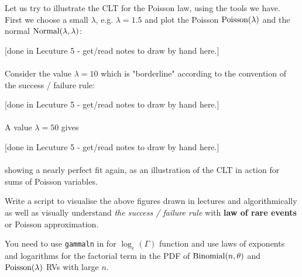 Let us try to illustrate the CLT for the Poisson law, using the tools we
have. First we choose a small $\lambda $, e.g. $\lambda =1.5$ and plot the
Poisson $\mbox{{\rm Poisson}}(\lambda )$ and the normal $\mbox{{\rm Normal}}(\lambda ,\lambda )$:


{\scriptsize [done in Lecuture 5 - get/read notes to draw by hand here.]}\\
\vspace{3cm} 
~\\


Consider the value $\lambda =10$ which is "borderline" according to the
convention of the success / failure rule: 


{\scriptsize [done in Lecuture 5 - get/read notes to draw by hand here.]}\\
\vspace{3cm} 
~\\


A value $\lambda =50$ gives 


{\scriptsize [done in Lecuture 5 - get/read notes to draw by hand here.]}\\
\vspace{3cm} 
~\\


showing a nearly perfect
fit again, as an illustration of the CLT in action for sums of Poisson
variables.

\begin{labwork}\label{LW:VisualiseSuccessFailureRulePoisson}
Write a \Matlab script to visualise the above figures drawn in lectures and algorithmically as well as visually understand {\em the success / failure rule} with {\bf law of rare events} or Poisson approximation.

You need to use {\tt gammaln} in \Matlab for $\log_e(\Gamma)$ function and use laws of exponents and logarithms for the factorial term in the PDF of $\mbox{{\rm Binomial}}(n,\theta)$ and $\mbox{{\rm Poisson}}(\lambda)$ RVs with large $n$.
\end{labwork}


